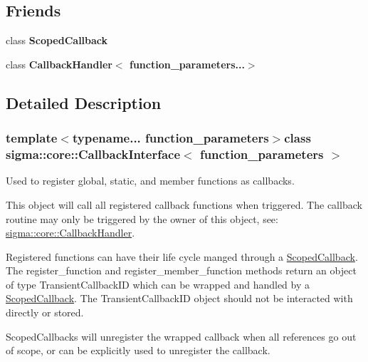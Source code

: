 \subsection*{Friends}
\begin{DoxyCompactItemize}
\item 
\hypertarget{classsigma_1_1core_1_1_callback_interface_a3414685dbc2eaa79d5e5af6729f74c0f}{class {\bfseries Scoped\-Callback}}\label{classsigma_1_1core_1_1_callback_interface_a3414685dbc2eaa79d5e5af6729f74c0f}

\item 
\hypertarget{classsigma_1_1core_1_1_callback_interface_a94b1ac13fdd15a778578dbb449af3b9e}{class {\bfseries Callback\-Handler$<$ function\-\_\-parameters...$>$}}\label{classsigma_1_1core_1_1_callback_interface_a94b1ac13fdd15a778578dbb449af3b9e}

\end{DoxyCompactItemize}


\subsection{Detailed Description}
\subsubsection*{template$<$typename... function\-\_\-parameters$>$class sigma\-::core\-::\-Callback\-Interface$<$ function\-\_\-parameters $>$}

Used to register global, static, and member functions as callbacks. 

This object will call all registered callback functions when triggered. The callback routine may only be triggered by the owner of this object, see\-: \hyperlink{classsigma_1_1core_1_1_callback_handler}{sigma\-::core\-::\-Callback\-Handler}.

Registered functions can have their life cycle manged through a \hyperlink{classsigma_1_1core_1_1_scoped_callback}{Scoped\-Callback}. The {\ttfamily register\-\_\-function} and {\ttfamily register\-\_\-member\-\_\-function} methods return an object of type Transient\-Callback\-I\-D which can be wrapped and handled by a \hyperlink{classsigma_1_1core_1_1_scoped_callback}{Scoped\-Callback}. The Transient\-Callback\-I\-D object should not be interacted with directly or stored.

Scoped\-Callbacks will unregister the wrapped callback when all references go out of scope, or can be explicitly used to unregister the callback.

